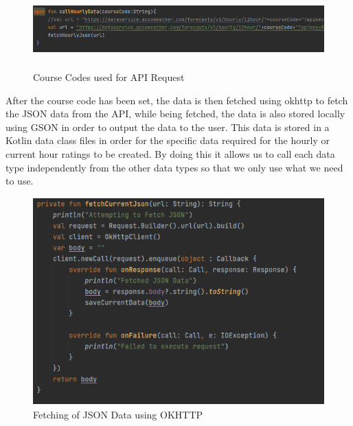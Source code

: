 \begin{figure}[H]
    \centering
    \includegraphics[width=16cm,height = 3cm]{img/APICall.PNG}
    \caption{Course Codes used for API Request}
    \label{fig:Course Codes used for API Request}
\end{figure}
After the course code has been set, the data is then fetched using okhttp to fetch the JSON data from the API, while being fetched, the data is also stored locally using GSON in order to output the data to the user.
\newline
\newline
This data is stored in a Kotlin data class files in order for the specific data required for the hourly or current hour ratings to be created. By doing this it allows us to call each data type independently from the other data types so that we only use what we need to use.

\begin{figure}[H]
    \centering
    \includegraphics[width=12cm,height = 8cm]{img/DataFetch.PNG}
    \caption{Fetching of JSON Data using OKHTTP}
    \label{fig:Fetching of JSON Data using OKHTTP}
\end{figure}

